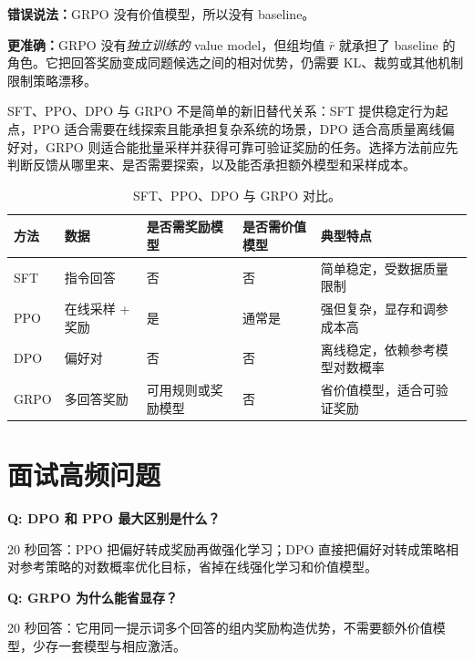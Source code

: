 \begin{wrongbox}
\textbf{错误说法：}GRPO 没有价值模型，所以没有 baseline。

\textbf{更准确：}GRPO 没有\emph{独立训练的} value model，但组均值 $\bar r$ 就承担了 baseline 的角色。它把回答奖励变成同题候选之间的相对优势，仍需要 KL、裁剪或其他机制限制策略漂移。
\end{wrongbox}

SFT、PPO、DPO 与 GRPO 不是简单的新旧替代关系：SFT 提供稳定行为起点，PPO 适合需要在线探索且能承担复杂系统的场景，DPO 适合高质量离线偏好对，GRPO 则适合能批量采样并获得可靠可验证奖励的任务。选择方法前应先判断反馈从哪里来、是否需要探索，以及能否承担额外模型和采样成本。

\begin{table}[htbp]
\centering
\small
\begin{tabularx}{0.95\textwidth}{lYYYY}
\toprule
方法 & 数据 & 是否需奖励模型 & 是否需价值模型 & 典型特点\\
\midrule
SFT & 指令回答 & 否 & 否 & 简单稳定，受数据质量限制\\
PPO & 在线采样 + 奖励 & 是 & 通常是 & 强但复杂，显存和调参成本高\\
DPO & 偏好对 & 否 & 否 & 离线稳定，依赖参考模型对数概率\\
GRPO & 多回答奖励 & 可用规则或奖励模型 & 否 & 省价值模型，适合可验证奖励\\
\bottomrule
\end{tabularx}
\caption{SFT、PPO、DPO 与 GRPO 对比。}
\end{table}

\section*{面试高频问题}

\textbf{Q: DPO 和 PPO 最大区别是什么？}

20 秒回答：PPO 把偏好转成奖励再做强化学习；DPO 直接把偏好对转成策略相对参考策略的对数概率优化目标，省掉在线强化学习和价值模型。

\textbf{Q: GRPO 为什么能省显存？}

20 秒回答：它用同一提示词多个回答的组内奖励构造优势，不需要额外价值模型，少存一套模型与相应激活。
